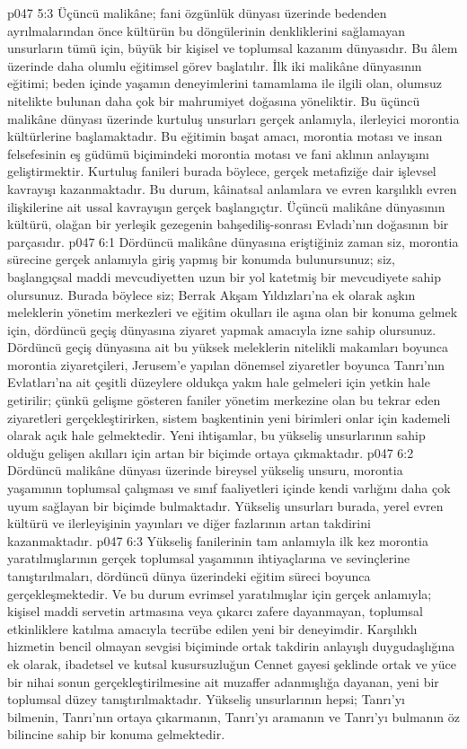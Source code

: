 \vs p047 5:3 Üçüncü malikâne; fani özgünlük dünyası üzerinde bedenden ayrılmalarından önce kültürün bu döngülerinin denkliklerini sağlamayan unsurların tümü için, büyük bir kişisel ve toplumsal kazanım dünyasıdır. Bu âlem üzerinde daha olumlu eğitimsel görev başlatılır. İlk iki malikâne dünyasının eğitimi; beden içinde yaşamın deneyimlerini tamamlama ile ilgili olan, olumsuz nitelikte bulunan daha çok bir mahrumiyet doğasına yöneliktir. Bu üçüncü malikâne dünyası üzerinde kurtuluş unsurları gerçek anlamıyla, ilerleyici morontia kültürlerine başlamaktadır. Bu eğitimin başat amacı, morontia motası ve insan felsefesinin eş güdümü biçimindeki morontia motası ve fani aklının anlayışını geliştirmektir. Kurtuluş fanileri burada böylece, gerçek metafiziğe dair işlevsel kavrayışı kazanmaktadır. Bu durum, kâinatsal anlamlara ve evren karşılıklı evren ilişkilerine ait ussal kavrayışın gerçek başlangıçtır. Üçüncü malikâne dünyasının kültürü, olağan bir yerleşik gezegenin bahşediliş\hyp{}sonrası Evladı’nın doğasının bir parçasıdır.
\vs p047 6:1 Dördüncü malikâne dünyasına eriştiğiniz zaman siz, morontia sürecine gerçek anlamıyla giriş yapmış bir konumda bulunursunuz; siz, başlangıçsal maddi mevcudiyetten uzun bir yol katetmiş bir mevcudiyete sahip olursunuz. Burada böylece siz; Berrak Akşam Yıldızları’na ek olarak aşkın meleklerin yönetim merkezleri ve eğitim okulları ile aşına olan bir konuma gelmek için, dördüncü geçiş dünyasına ziyaret yapmak amacıyla izne sahip olursunuz. Dördüncü geçiş dünyasına ait bu yüksek meleklerin nitelikli makamları boyunca morontia ziyaretçileri, Jerusem’e yapılan dönemsel ziyaretler boyunca Tanrı’nın Evlatları’na ait çeşitli düzeylere oldukça yakın hale gelmeleri için yetkin hale getirilir; çünkü gelişme gösteren faniler yönetim merkezine olan bu tekrar eden ziyaretleri gerçekleştirirken, sistem başkentinin yeni birimleri onlar için kademeli olarak açık hale gelmektedir. Yeni ihtişamlar, bu yükseliş unsurlarının sahip olduğu gelişen akılları için artan bir biçimde ortaya çıkmaktadır.
\vs p047 6:2 Dördüncü malikâne dünyası üzerinde bireysel yükseliş unsuru, morontia yaşamının toplumsal çalışması ve sınıf faaliyetleri içinde kendi varlığını daha çok uyum sağlayan bir biçimde bulmaktadır. Yükseliş unsurları burada, yerel evren kültürü ve ilerleyişinin yayınları ve diğer fazlarının artan takdirini kazanmaktadır.
\vs p047 6:3 Yükseliş fanilerinin tam anlamıyla ilk kez morontia yaratılmışlarının gerçek toplumsal yaşamının ihtiyaçlarına ve sevinçlerine tanıştırılmaları, dördüncü dünya üzerindeki eğitim süreci boyunca gerçekleşmektedir. Ve bu durum evrimsel yaratılmışlar için gerçek anlamıyla; kişisel maddi servetin artmasına veya çıkarcı zafere dayanmayan, toplumsal etkinliklere katılma amacıyla tecrübe edilen yeni bir deneyimdir. Karşılıklı hizmetin bencil olmayan sevgisi biçiminde ortak takdirin anlayışlı duygudaşlığına ek olarak, ibadetsel ve kutsal kusursuzluğun Cennet gayesi şeklinde ortak ve yüce bir nihai sonun gerçekleştirilmesine ait muzaffer adanmışlığa dayanan, yeni bir toplumsal düzey tanıştırılmaktadır. Yükseliş unsurlarının hepsi; Tanrı’yı bilmenin, Tanrı’nın ortaya çıkarmanın, Tanrı’yı aramanın ve Tanrı’yı bulmanın öz bilincine sahip bir konuma gelmektedir.
